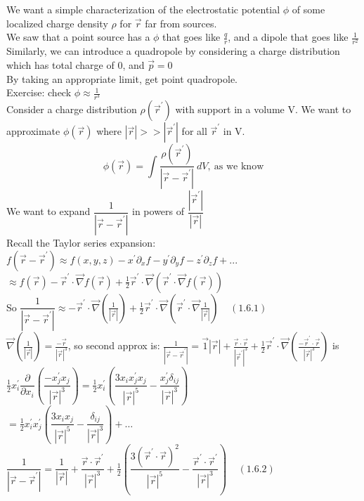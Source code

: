 \documentclass[a4paper,11pt]{article}
\newcommand{\pd}[2]{\dfrac{\partial #1}{\partial #2}}
\begin{document}
We want a simple characterization of the electrostatic potential $\phi$ of some localized charge density $\rho$ for $\vec{r}$ far from sources.\\
We saw that a point source has a $\phi$ that goes like $\frac{q}{r}$, and a dipole that goes like $\frac{1}{r^2}$\\
Similarly, we can introduce a quadropole by considering a charge distribution which has total charge of 0, and $\vec{p}=0$\\
By taking an appropriate limit, get point quadropole.\\
Exercise: check $\phi \approx \frac{1}{r^3}$\\
Consider a charge distribution $\rho(\vec{r}^\prime)$ with support in a volume V. We want to approximate $\phi(\vec{r})$ where $|\vec{r}|>>|\vec{r}^\prime|$ for all $\vec{r}^\prime$ in V.
$$\phi(\vec{r})=\int \dfrac{\rho(\vec{r}^\prime)}{|\vec{r}-\vec{r}^\prime|}~dV,~\text{as we know}$$
We want to expand $\dfrac{1}{|\vec{r}-\vec{r}^\prime|}$ in powers of $\dfrac{|\vec{r}^\prime|}{|\vec{r}|}$\\
Recall the Taylor series expansion:\\
$f(\vec{r}-\vec{r}^\prime)\approx f(x,y,z)-x^\prime\partial_xf-y^\prime \partial_y f- z^\prime\partial_z f+...$\\
$\approx f(\vec{r}) -\vec{r}^\prime \cdot \vec{\nabla}f(\vec{r})+\frac{1}{2}\vec{r}^\prime \cdot \vec{\nabla}(\vec{r}^\prime \cdot \vec{\nabla} f(\vec{r}))$\\
So $\dfrac{1}{|\vec{r}-\vec{r}^\prime|} \approx -\vec{r}^\prime \cdot \vec{\nabla}(\frac{1}{|\vec{r}|}) + \frac{1}{2} \vec{r}^\prime \cdot \vec{\nabla}(\vec{r}^\prime\cdot \vec{\nabla}\frac{1}{|\vec{r}|})~~~~~(1.6.1)$\\
$\vec{\nabla}(\frac{1}{|\vec{r}|})=\frac{-\vec{r}}{|\vec{r}|^3}$, so second approx is:
$\frac{1}{|\vec{r}-\vec{r}^\prime|}=\vec{1}{|\vec{r}|}+\frac{\vec{r}\cdot\vec{r}}{|\vec{r}^\prime|^3}+\frac{1}{2}\vec{r}^\prime\cdot\vec{\nabla}(\frac{-\vec{r}^\prime \cdot \vec{r}}{|\vec{r}|^3})$ is \\
$\frac{1}{2} x^\prime _i \pd{}{x_i}(\dfrac{-x^\prime _j x_j}{|\vec{r}|^3})=\frac{1}{2} x^\prime _i (\dfrac{3x_i x_j ^\prime x_j}{|\vec{r}|^5} - \dfrac{x^\prime _j \delta_{ij}}{|\vec{r}|^3})$\\
$=\frac{1}{2}x^\prime _i x^\prime_j (\dfrac{3x_ix_j}{|\vec{r}|^5}-\dfrac{\delta_{ij}}{|\vec{r}|^3})+\ldots$\\
$\dfrac{1}{|\vec{r}-\vec{r}^\prime|}=\dfrac{1}{|\vec{r}|}+\dfrac{\vec{r}\cdot\vec{r}^\prime}{|\vec{r}|^3}+\frac{1}{2}(\dfrac{3(\vec{r}^\prime\cdot \vec{r})^2}{|\vec{r}|^5}-\dfrac{\vec{r}^\prime\cdot \vec{r}^\prime}{|\vec{r}|^3})~~~~~(1.6.2)$\\
\end{document}
